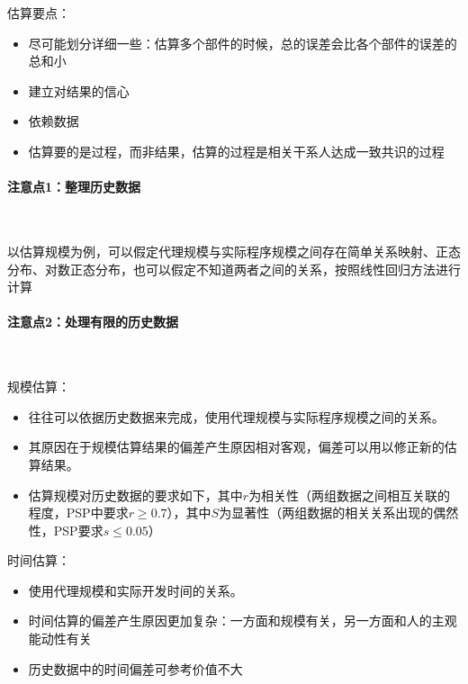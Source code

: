 估算要点：
\vspace{-0.8em}
\begin{multicols}{2}
    \begin{itemize}
        \item 尽可能划分详细一些：估算多个部件的时候，总的误差会比各个部件的误差的总和小
        \item 建立对结果的信心
        \item 依赖数据
        \item 估算要的是过程，而非结果，估算的过程是相关干系人达成一致共识的过程
    \end{itemize}
\end{multicols}
\vspace{-1em}

\paragraph{注意点1：整理历史数据}~{} \par
以估算规模为例，可以假定代理规模与实际程序规模之间存在简单关系映射、正态分布、对数正态分布，也可以假定不知道两者之间的关系，按照线性回归方法进行计算


\paragraph{注意点2：处理有限的历史数据}~{} \par
规模估算：
\begin{itemize}
    \item 往往可以依据历史数据来完成，使用代理规模与实际程序规模之间的关系。
    \item 其原因在于规模估算结果的偏差产生原因相对客观，偏差可以用以修正新的估算结果。
    \item 估算规模对历史数据的要求如下，其中$r$为相关性（两组数据之间相互关联的程度，PSP中要求$r\geq 0.7$），其中$S$为显著性（两组数据的相关关系出现的偶然性，PSP要求$s\leq 0.05$）
\end{itemize}



时间估算：
\begin{itemize}
    \item 使用代理规模和实际开发时间的关系。
    \item 时间估算的偏差产生原因更加复杂：一方面和规模有关，另一方面和人的主观能动性有关
    \item 历史数据中的时间偏差可参考价值不大
\end{itemize}

